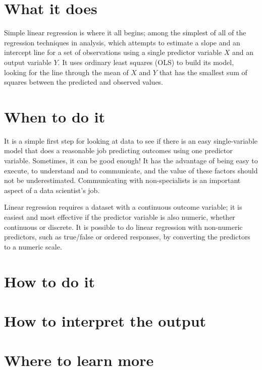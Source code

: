 \documentclass[
]{book}
\begin{document}
\hypertarget{what-it-does}{%
\section{What it does}\label{what-it-does}}

Simple linear regression is where it all begins; among the simplest of all of the regression techniques in analysis, which attempts to estimate a slope and an intercept line for a set of observations using a single predictor variable \(X\) and an output variable \(Y\). It uses ordinary least squares (OLS) to build its model, looking for the line through the mean of \(X\) and \(Y\) that has the smallest sum of squares between the predicted and observed values.

\hypertarget{when-to-do-it}{%
\section{When to do it}\label{when-to-do-it}}

It is a simple first step for looking at data to see if there is an easy single-variable model that does a reasonable job predicting outcomes using one predictor variable. Sometimes, it can be good enough! It has the advantage of being easy to execute, to understand and to communicate, and the value of these factors should not be underestimated. Communicating with non-specialists is an important aspect of a data scientist's job.

Linear regression requires a dataset with a continuous outcome variable; it is easiest and most effective if the predictor variable is also numeric, whether continuous or discrete. It is possible to do linear regression with non-numeric predictors, such as true/false or ordered responses, by converting the predictors to a numeric scale.

\hypertarget{how-to-do-it}{%
\section{How to do it}\label{how-to-do-it}}

\hypertarget{how-to-interpret-the-output}{%
\section{How to interpret the output}\label{how-to-interpret-the-output}}

\hypertarget{where-to-learn-more}{%
\section{Where to learn more}\label{where-to-learn-more}}
\end{document}
